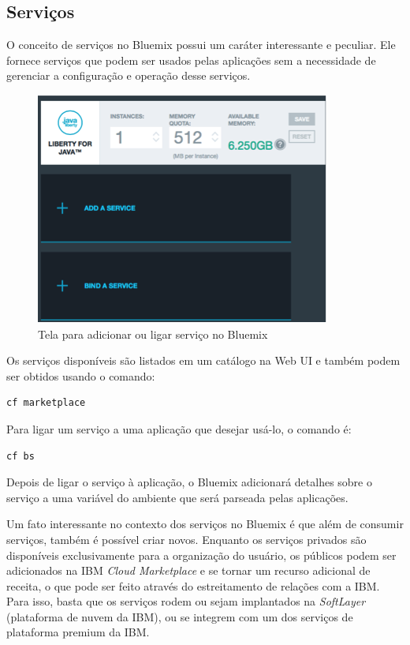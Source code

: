 \subsection{Serviços}

O conceito de serviços no Bluemix possui um caráter interessante e peculiar. Ele fornece serviços que podem ser usados pelas aplicações sem a necessidade de gerenciar a configuração e operação desse serviços.

\begin{figure}[!htb]
    \centering
    \includegraphics{imagens/servico}
    \caption{Tela para adicionar ou ligar serviço no Bluemix}
    \label{Rotulo}
\end{figure}

Os serviços disponíveis são listados em um catálogo na Web UI e também podem ser obtidos usando o comando:
\begin{lstlisting}
cf marketplace
\end{lstlisting}

Para ligar um serviço a uma aplicação que desejar usá-lo, o comando é:
\begin{lstlisting}
cf bs
\end{lstlisting}

Depois de ligar o serviço à aplicação, o Bluemix adicionará detalhes sobre o serviço a uma variável do ambiente que será parseada pelas aplicações.

Um fato interessante no contexto dos serviços no Bluemix é que além de consumir serviços, também é possível criar novos. Enquanto os serviços privados são disponíveis exclusivamente para a organização do usuário, os públicos podem ser adicionados na IBM \textit{Cloud Marketplace} e se tornar um recurso adicional de receita, o que pode ser feito através do estreitamento de relações com a IBM. Para isso, basta que os serviços rodem ou sejam implantados na \textit{SoftLayer} (plataforma de nuvem da IBM), ou se integrem com um dos serviços de plataforma premium da IBM.

